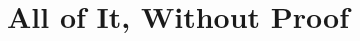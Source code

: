 
\renewcommand{\parthook}{%
\AddToShipoutPictureBG*{%
\AtPageLowerLeft{\texttt{[image: figures/longstory]}}}%
\renewcommand{\parthook}{}}%
\part{All of It, Without Proof}






